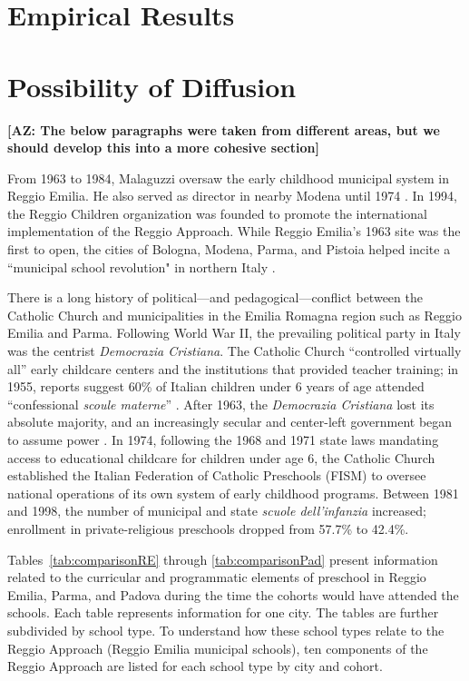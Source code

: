 \section{Empirical Results}
\label{sec:results}


\section{Possibility of Diffusion}
\label{sec:diffusion}

\textbf{[AZ: The below paragraphs were taken from different areas, but we should develop this into a more cohesive section]}

From 1963 to 1984, Malaguzzi oversaw the early childhood municipal system in Reggio Emilia. He also served as director in nearby Modena until 1974 \citep{Cagliari-etal-eds_2016_BOOK_Loris-Malaguzzi}. In 1994, the Reggio Children organization was founded to promote the international implementation of the Reggio Approach. While Reggio Emilia's 1963 site was the first to open, the cities of Bologna, Modena, Parma, and Pistoia helped incite a ``municipal school revolution" in northern Italy \citep{Hohnerlein_2015_Development-and-Diffusion}. 

There is a long history of political---and pedagogical---conflict between the Catholic Church and municipalities in the Emilia Romagna region such as Reggio Emilia and Parma. Following World War II, the prevailing political party in Italy was the centrist \textit{Democrazia Cristiana}. The Catholic Church ``controlled virtually all'' early childcare centers and the institutions that provided teacher training; in 1955, reports suggest 60\% of Italian children under 6 years of age attended ``confessional \textit{scoule materne}'' \citep{Hohnerlein_2015_Development-and-Diffusion}. After 1963, the \textit{Democrazia Cristiana} lost its absolute majority, and an increasingly secular and center-left government began to assume power \citep{Hohnerlein_2009_Paradox-Public-Preschools}. In 1974, following the 1968 and 1971 state laws mandating access to educational childcare for children under age 6, the Catholic Church established the Italian Federation of Catholic Preschools (FISM) to oversee national operations of its own system of early childhood programs. Between 1981 and 1998, the number of municipal and state \textit{scuole dell'infanzia} increased; enrollment in private-religious preschools dropped from 57.7\% to 42.4\%.

Tables~\ref{tab:comparisonRE} through \ref{tab:comparisonPad} present information related to the curricular and programmatic elements of preschool in Reggio Emilia, Parma, and Padova during the time the cohorts would have attended the schools. Each table represents information for one city. The tables are further subdivided by school type. To understand how these school types relate to the Reggio Approach (Reggio Emilia municipal schools), ten components of the Reggio Approach are listed for each school type by city and cohort. 

